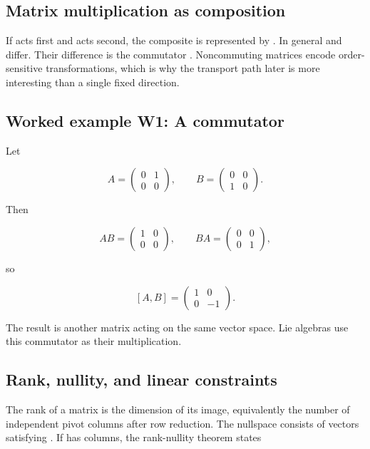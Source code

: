 \documentclass[11pt]{article}
\begin{document}
\subsection{Matrix multiplication as composition}

If \texttt{} acts first and \texttt{} acts second, the composite is represented by \texttt{}. In general \texttt{} and \texttt{} differ. Their difference is the commutator \texttt{\detokenize{[A,B]}}. Noncommuting matrices encode order-sensitive transformations, which is why the transport path later is more interesting than a single fixed direction.

\subsection{Worked example W1: A commutator}

Let

\[
A=\begin{pmatrix}0&1\\0&0\end{pmatrix},
\qquad
B=\begin{pmatrix}0&0\\1&0\end{pmatrix}.
\]

Then

\[
AB=\begin{pmatrix}1&0\\0&0\end{pmatrix},
\qquad
BA=\begin{pmatrix}0&0\\0&1\end{pmatrix},
\]

so

\[
[A,B]=\begin{pmatrix}1&0\\0&-1\end{pmatrix}.
\]

The result is another matrix acting on the same vector space. Lie algebras use this commutator as their multiplication.

\subsection{Rank, nullity, and linear constraints}

The rank of a matrix is the dimension of its image, equivalently the number of independent pivot columns after row reduction. The nullspace consists of vectors \texttt{} satisfying \texttt{}. If \texttt{} has \texttt{} columns, the rank-nullity theorem states
\end{document}
